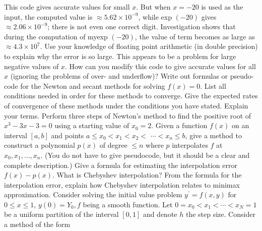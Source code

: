 \documentclass[14pt]{extarticle}
\begin{document}
This code gives accurate values for small $x$. But when $x=-20$ is used as the input, the computed value is $\approx 5.62 \times 10^{-9}$, while exp $(-20)$ gives $\approx 2.06 \times 10^{-9}$; there is not even one correct digit. Investigation shows that during the computation of myexp $(-20)$, the value of term becomes as large as $\approx 4.3 \times 10^{7}$. Use your knowledge of floating point arithmetic (in double precision) to explain why the error is so large. This appears to be a problem for large negative values of $x$. How can you modify this code to give accurate values for all $x$ (ignoring the problems of over- and underflow)?
\newpage
Write out formulas or pseudo-code for the Newton and secant methods for solving $f(x)=0$. List all conditions needed in order for these methods to converge. Give the expected rates of convergence of these methods under the conditions you have stated. Explain your terms. Perform three steps of Newton's method to find the positive root of $x^{3}-3 x-3=0$ using a starting value of $x_{0}=2$.
\newpage
Given a function $f(x)$ on an interval $[a, b]$ and points $a \leq x_{0}<x_{1}<x_{2}<$ $\cdots<x_{n} \leq b$, give a method to construct a polynomial $p(x)$ of degree $\leq n$ where $p$ interpolates $f$ at $x_{0}, x_{1}, \ldots, x_{n}$. (You do not have to give pseudocode, but it should be a clear and complete description.) Give a formula for estimating the interpolation error $f(x)-p(x)$. What is Chebyshev interpolation? From the formula for the interpolation error, explain how Chebyshev interpolation relates to minimax approximation.
\newpage
Consider solving the initial value problem $y^{\prime}=f(x, y)$ for $0 \leq x \leq 1$, $y(0)=Y_{0}, f$ being a smooth function. Let $0=x_{0}<x_{1}<\cdots<x_{N}=1$ be a uniform partition of the interval $[0,1]$ and denote $h$ the step size. Consider a method of the form
\end{document}

